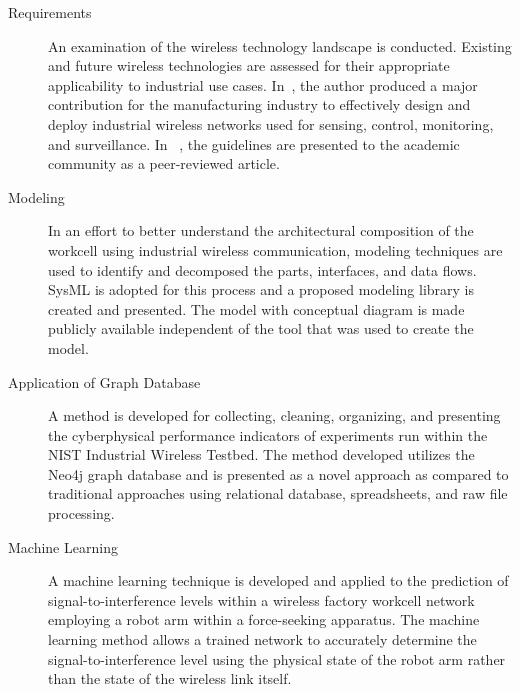 {		\begin{description}
	
	\item[Requirements] \cite{CandellRW2017} \cite{Montgomery2019} \cite{Candell2018.IWSGuide} \cite{ieeeMagazine2018} An examination of the wireless technology landscape is conducted.  Existing and future wireless technologies are assessed for their appropriate applicability to industrial use cases. In~\cite{Candell2018.IWSGuide}, the author produced a major contribution for the manufacturing industry to effectively design and deploy industrial wireless networks used for sensing, control, monitoring, and surveillance.  In ~\cite{ieeeMagazine2018}, the guidelines are presented to the academic community as a peer-reviewed article.
	
	\item[Modeling] \cite{Candell2019ASR.SYSML} \cite{Candell2018SysML.JRES} In an effort to better understand the architectural composition of the workcell using industrial wireless communication, modeling techniques are used to identify and decomposed the parts, interfaces, and data flows.  SysML is adopted for this process and a proposed modeling library is created and presented.  The model with conceptual diagram is made publicly available independent of the tool that was used to create the model.
	
	\item[Application of Graph Database] \cite{CandellISIT2020.Conf} A method is developed for collecting, cleaning, organizing, and presenting the cyberphysical performance indicators of experiments run within the NIST Industrial Wireless Testbed. The method developed utilizes the Neo4j graph database and is presented as a novel approach as compared to traditional approaches using relational database, spreadsheets, and raw file processing.
	
	\item[Machine Learning] \cite{CandellISIE2019.Conf} \cite{Candell2020.Jrnl.Access} A machine learning technique is developed and applied to the prediction of signal-to-interference levels within a wireless factory workcell network employing a robot arm within a force-seeking apparatus.  The machine learning method allows a trained network to accurately determine the signal-to-interference level using the physical state of the robot arm rather than the state of the wireless link itself.
	
\end{description}

}

